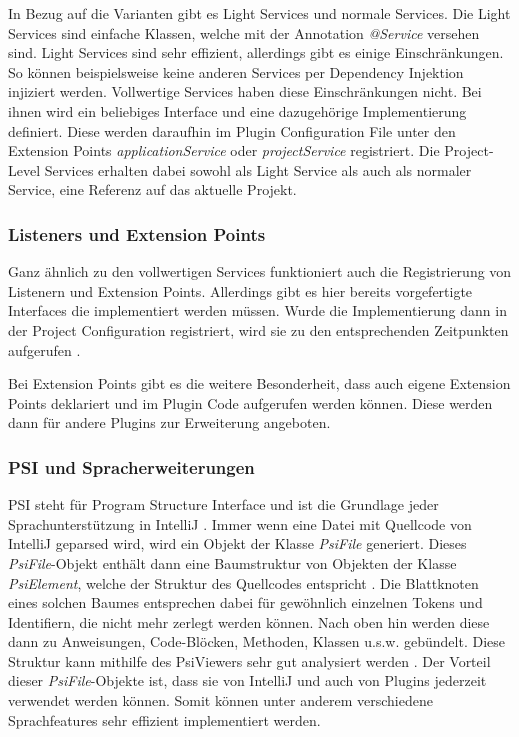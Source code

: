   In Bezug auf die Varianten gibt es Light Services und normale Services.
  Die Light Services sind einfache Klassen, welche mit der Annotation \emph{@Service}
  versehen sind. Light Services sind sehr effizient, allerdings gibt es einige Einschränkungen.
  So können beispielsweise keine anderen Services per Dependency Injektion injiziert werden.
  Vollwertige Services haben diese Einschränkungen nicht. Bei ihnen wird ein beliebiges Interface und
  eine dazugehörige Implementierung definiert. Diese werden daraufhin im Plugin Configuration File
  unter den Extension Points \emph{applicationService} oder \emph{projectService} registriert.
  Die Project-Level Services erhalten dabei sowohl als Light Service als auch als normaler Service, 
  eine Referenz auf das aktuelle Projekt.

\subsubsection{Listeners und Extension Points}

  Ganz ähnlich zu den vollwertigen Services funktioniert auch die Registrierung von Listenern
  und Extension Points. Allerdings gibt es hier bereits vorgefertigte Interfaces die implementiert
  werden müssen. Wurde die Implementierung dann in der Project Configuration registriert, wird
  sie zu den entsprechenden Zeitpunkten aufgerufen 
  \cite{IntelliJPlatformSDKExtensionPoints,IntelliJPlatformSDKListeners}.
  
  Bei Extension Points gibt es die weitere Besonderheit, dass auch eigene Extension Points deklariert
  und im Plugin Code aufgerufen werden können. Diese werden dann für andere Plugins zur Erweiterung
  angeboten.

\subsubsection{PSI und Spracherweiterungen}

  PSI steht für Program Structure Interface und ist die Grundlage jeder Sprachunterstützung in
  IntelliJ \cite{IntelliJPlatformSDKPSI}. 
  Immer wenn eine Datei mit Quellcode von IntelliJ geparsed wird, wird ein
  Objekt der Klasse \emph{PsiFile} generiert. 
  Dieses \emph{PsiFile}-Objekt enthält dann eine Baumstruktur von Objekten der Klasse
  \emph{PsiElement}, welche der Struktur des Quellcodes entspricht 
  \cite{IntelliJPlatformSDKPSIFiles,IntelliJPlatformSDKPSIElements}. 
  Die Blattknoten eines solchen Baumes entsprechen dabei
  für gewöhnlich einzelnen Tokens und Identifiern, die nicht mehr zerlegt werden können.
  Nach oben hin werden diese dann zu Anweisungen, Code-Blöcken, Methoden, Klassen u.s.w. gebündelt.
  Diese Struktur kann mithilfe des PsiViewers sehr gut analysiert werden 
  \cite{IntelliJPlatformSDKPsiViewer}.
  Der Vorteil dieser \emph{PsiFile}-Objekte ist, dass sie von IntelliJ und auch von Plugins jederzeit
  verwendet werden können. Somit können unter anderem verschiedene Sprachfeatures sehr
  effizient implementiert werden.

